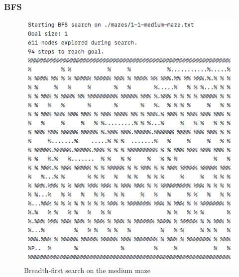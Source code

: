 \documentclass[titlepage]{article}
\begin{document}
\subsubsection*{BFS}
\begin{figure}[h!]
\includegraphics[width=\linewidth]{bfsmedium.png}
\caption{Breadth-first search on the medium maze}
\label{fig:BFSmedium}
\end{figure}

\newpage
\end{document}
